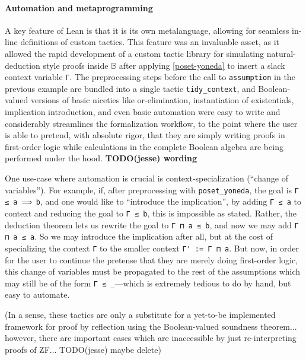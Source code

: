 \documentclass[a4paper,USenglish,cleveref, autoref]{lipics-v2019}
\newcommand{\B}{\mathbb{B}}
\newcommand{\lil}{\lstinline}
\begin{document}
\paragraph*{Automation and metaprogramming}
A key feature of Lean is that it is its own metalanguage, allowing for seamless in-line definitions of custom tactics. This feature was an invaluable asset, as it allowed the rapid development of a custom tactic library for simulating natural-deduction style proofs inside $\B$ after applying \autoref{poset-yoneda} to insert a slack context variable \lil{Γ}. The preprocessing steps before the call to \lil{assumption} in the previous example are bundled into a single tactic \lil{tidy_context}, and Boolean-valued versions of basic niceties like or-elimination, instantiation of existentials, implication introduction, and even basic automation were easy to write and considerably streamlines the formalization workflow, to the point where the user is able to pretend, with absolute rigor, that they are simply writing proofs in first-order logic while calculations in the complete Boolean algebra are being performed under the hood. \textbf{TODO(jesse) wording}

One use-case where automation is crucial is context-specialization (``change of variables''). For example, if, after preprocessing with \lstinline{poset_yoneda}, the goal is \lstinline{Γ ≤ a ⟹ b}, and one would like to ``introduce the implication'', by adding \lstinline{Γ ≤ a} to context and reducing the goal to \lstinline{Γ ≤ b}, this is impossible as stated. Rather, the deduction theorem lets us rewrite the goal to \lstinline{Γ ⊓ a ≤ b}, and now we may add \lstinline{Γ ⊓ a ≤ a}. So we may introduce the implication after all, but at the cost of specializing the context \lstinline{Γ} to the smaller context \lstinline{Γ' := Γ ⊓ a}. But now, in order for the user to continue the pretense that they are merely doing first-order logic, this change of variables must be propagated to the rest of the assumptions which may still be of the form \lstinline{Γ ≤ _}---which is extremely tedious to do by hand, but easy to automate.

(In a sense, these tactics are only a substitute for a yet-to-be implemented framework for proof by reflection using the Boolean-valued soundness theorem... however, there are important cases which are inaccessible by just re-interpreting proofs of ZF... TODO(jesse) maybe delete)

\end{document}
